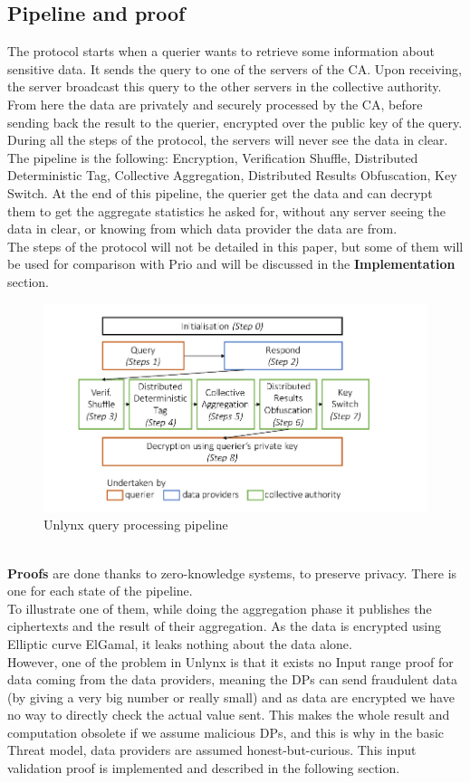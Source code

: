 \documentclass{article}
\begin{document}
\subsection{Pipeline and proof}
The protocol starts when a querier wants to retrieve some information about sensitive data. It sends the query to one of the servers of the CA. Upon receiving, the server broadcast this query to the other servers in the collective authority.\\
From here the data are privately and securely processed by the CA, before sending back the result to the querier, encrypted over the public key of the query. During all the steps of the protocol, the servers will never see the data in clear.\\
The pipeline is the following: Encryption, Verification Shuffle, Distributed Deterministic Tag, Collective Aggregation, Distributed Results Obfuscation, Key Switch. At the end of this pipeline, the querier get the data and can decrypt them to get the aggregate statistics he asked for, without any server seeing the data in clear, or knowing from which data provider the data are from.\\
The steps of the protocol will not be detailed in this paper, but some of them will be used for comparison with Prio and will be discussed in the \textbf{Implementation} section.
\begin{figure}[h]
\centering
\includegraphics[scale=0.5]{img/unlynxPip.png}
\caption{Unlynx query processing pipeline}
\end{figure}
\\
\textbf{Proofs} are done thanks to zero-knowledge systems, to preserve privacy. There is one for each state of the pipeline.\\
To illustrate one of them, while doing the aggregation phase it publishes the ciphertexts and the result of their aggregation. As the data is encrypted using Elliptic curve ElGamal, it leaks nothing about the data alone.\\
However, one of the problem in Unlynx is that it exists no Input range proof for data coming from the data providers, meaning the DPs can send fraudulent data (by giving a very big number or really small) and as data are encrypted we have no way to directly check the actual value sent. This makes the whole result and computation obsolete if we assume malicious DPs, and this is why in the basic Threat model, data providers are assumed honest-but-curious. This input validation proof is implemented and described in the following section.\\
\end{document}
